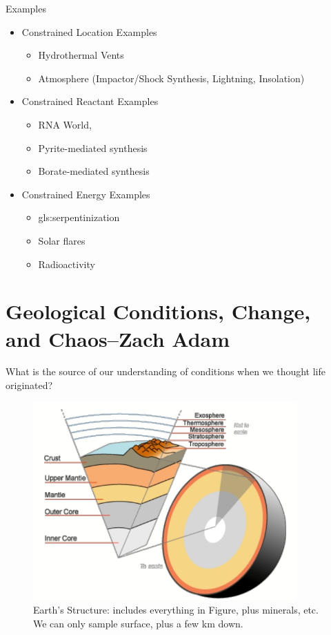 \documentclass[]{article}
\begin{document}
Examples
\begin{itemize}
	\item Constrained Location Examples \begin{itemize}
		\item Hydrothermal Vents\cite{martin2006origin}
		\item Atmosphere (Impactor/Shock Synthesis, Lightning,
		Insolation)\cite{chyba1992endogenous} \cite{miller1959organic}
	\end{itemize}
	\item Constrained Reactant Examples 
	\begin{itemize}
		\item RNA World\cite{powner2009synthesis},
		\item Pyrite-mediated synthesis\cite{wachtershauser1993cradle}
		\item Borate-mediated synthesis\cite{grew2011borate}
	\end{itemize}
	\item Constrained Energy Examples
	\begin{itemize}
		\item \Gls{gls:serpentinization}\cite{schrenk2013serpentinization}
		\item Solar flares\cite{airapetian2016prebiotic}
		\item Radioactivity\cite{yi2018radiolytic} \cite{adam2018estimating}
	\end{itemize}
\end{itemize}

\section[Geological Conditions, Change, and Chaos]{Geological Conditions, Change, and Chaos--Zach Adam}

What is the source of our understanding of conditions when we thought life originated?
\begin{figure}[H]
	\caption[Earth's Structure]{Earth's Structure: includes everything in Figure, plus minerals, etc. We can only sample surface, plus a few km  down.}\label{fig:EarthStructure} 
	\includegraphics[width=0.9\textwidth]{EarthStructure}
\end{figure}
\end{document}
